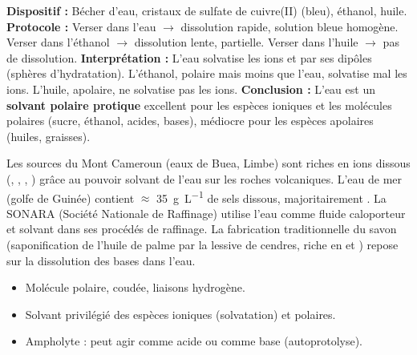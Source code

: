 \documentclass[11pt]{article}
\newcounter{popsec}
\newcounter{popsub}
\newcommand{\courssub}[1]{%
  \stepcounter{popsub}%
  \par\vspace{9pt}\noindent{\popxbold\fontsize{11.5}{13}\selectfont\color{popink}{\color{poporange}\thepopsec.\thepopsub}\hspace{6pt}#1}\par\nopagebreak\vspace{4pt}
}
\begin{document}
\begin{experience}
\textbf{Dispositif :} Bécher d'eau, cristaux de sulfate de cuivre(II)  (bleu), éthanol, huile.
\textbf{Protocole :} Verser  dans l'eau $\to$ dissolution rapide, solution bleue homogène. Verser  dans l'éthanol $\to$ dissolution lente, partielle. Verser  dans l'huile $\to$ pas de dissolution.
\textbf{Interprétation :} L'eau solvatise les ions  et  par ses dipôles (sphères d'hydratation). L'éthanol, polaire mais moins que l'eau, solvatise mal les ions. L'huile, apolaire, ne solvatise pas les ions.
\textbf{Conclusion :} L'eau est un \textbf{solvant polaire protique} excellent pour les espèces ioniques et les molécules polaires (sucre, éthanol, acides, bases), médiocre pour les espèces apolaires (huiles, graisses).
\end{experience}

\begin{savaistu}
Les sources du Mont Cameroun (eaux de Buea, Limbe) sont riches en ions dissous (, , , ) grâce au pouvoir solvant de l'eau sur les roches volcaniques. L'eau de mer (golfe de Guinée) contient $\approx$ \SI{35}{g.L^{-1}} de sels dissous, majoritairement . La SONARA (Société Nationale de Raffinage) utilise l'eau comme fluide caloporteur et solvant dans ses procédés de raffinage. La fabrication traditionnelle du savon (saponification de l'huile de palme par la lessive de cendres, riche en  et ) repose sur la dissolution des bases dans l'eau.
\end{savaistu}

\begin{aretenir}
\begin{itemize}
\item Molécule polaire, coudée, liaisons hydrogène.
\item Solvant privilégié des espèces ioniques (solvatation) et polaires.
\item Ampholyte : peut agir comme acide ou comme base (autoprotolyse).
\end{itemize}
\end{aretenir}

\courssub{Acides et bases selon Brønsted}
\end{document}
